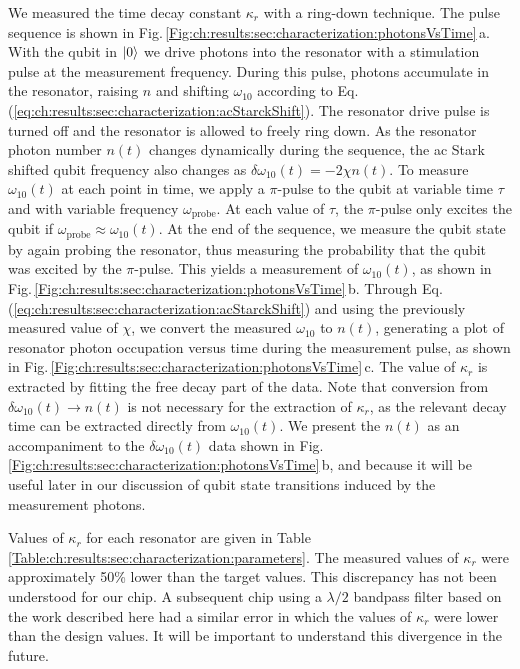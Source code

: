 We measured the time decay constant $\kappa_r$ with a ring-down technique.
The pulse sequence is shown in Fig.\,\ref{Fig:ch:results:sec:characterization:photonsVsTime}\,a.
With the qubit in $|0\rangle$ we drive photons into the resonator with a stimulation pulse at the measurement frequency.
During this pulse, photons accumulate in the resonator, raising $n$ and shifting $\omega_{10}$ according to Eq.\,(\ref{eq:ch:results:sec:characterization:acStarckShift}).
The resonator drive pulse is turned off and the resonator is allowed to freely ring down.
As the resonator photon number $n(t)$ changes dynamically during the sequence, the ac Stark shifted qubit frequency also changes as $\delta \omega_{10}(t) = -2\chi n(t)$.
To measure $\omega_{10}(t)$ at each point in time, we apply a $\pi$-pulse to the qubit at variable time $\tau$ and with variable frequency $\omega_{\text{probe}}$.
At each value of $\tau$, the $\pi$-pulse only excites the qubit if $\omega_{\text{probe}} \approx \omega_{10}(t)$.
At the end of the sequence, we measure the qubit state by again probing the resonator, thus measuring the probability that the qubit was excited by the $\pi$-pulse.
This yields a measurement of $\omega_{10}(t)$, as shown in Fig.\,\ref{Fig:ch:results:sec:characterization:photonsVsTime}\,b.
Through Eq.\,(\ref{eq:ch:results:sec:characterization:acStarckShift}) and using the previously measured value of $\chi$, we convert the measured $\omega_{10}$ to $n(t)$, generating a plot of resonator photon occupation versus time during the measurement pulse, as shown in Fig.\,\ref{Fig:ch:results:sec:characterization:photonsVsTime}\,c.
The value of $\kappa_r$ is extracted by fitting the free decay part of the data.
Note that conversion from $\delta \omega_{10}(t) \rightarrow n(t)$ is not necessary for the extraction of $\kappa_r$, as the relevant decay time can be extracted directly from $\omega_{10}(t)$.
We present the $n(t)$ as an accompaniment to the $\delta \omega_{10}(t)$ data shown in Fig.\,\ref{Fig:ch:results:sec:characterization:photonsVsTime}\,b, and because it will be useful later in our discussion of qubit state transitions induced by the measurement photons.

Values of $\kappa_r$ for each resonator are given in Table \ref{Table:ch:results:sec:characterization:parameters}.
The measured values of $\kappa_r$ were approximately 50\% lower than the target values.
This discrepancy has not been understood for our chip.
A subsequent chip using a $\lambda/2$ bandpass filter based on the work described here had a similar error in which the values of $\kappa_r$ were lower than the design values.
It will be important to understand this divergence in the future.

